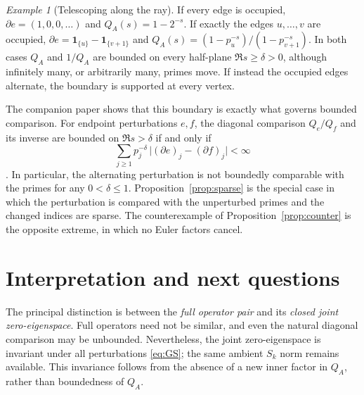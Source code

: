 \documentclass[12pt,letterpaper]{article}
\theoremstyle{remark}
\newtheorem{example}[theorem]{Example}
\numberwithin{equation}{section}
\begin{document}
\begin{example}[Telescoping along the ray]\label{ex:ray}
If every edge is occupied, $\partial e=(1,0,0,\ldots)$ and
$Q_A(s)=1-2^{-s}$.  If exactly the edges $u,\ldots,v$ are occupied,
$\partial e=\mathbf 1_{\{u\}}-\mathbf 1_{\{v+1\}}$ and
$Q_A(s)=(1-p_u^{-s})/(1-p_{v+1}^{-s})$.  In both cases $Q_A$ and $1/Q_A$
are bounded on every half-plane $\Re s\ge\delta>0$, although infinitely
many, or arbitrarily many, primes move.  If instead the occupied edges
alternate, the boundary is supported at every vertex.
\end{example}

The companion paper shows that this boundary is exactly what governs
bounded comparison.  For endpoint perturbations $e,f$, the diagonal
comparison $Q_e/Q_f$ and its inverse are bounded on $\Re s>\delta$ if
and only if
\[
 \sum_{j\ge1}p_j^{-\delta}\,\bigl|(\partial e)_j-(\partial f)_j\bigr|<\infty
\]
\cite[Theorem~5.1]{PP26}.  In particular, the alternating perturbation
is not boundedly comparable with the primes for any $0<\delta\le1$.
Proposition~\ref{prop:sparse} is the special case in which the
perturbation is compared with the unperturbed primes and the changed
indices are sparse.  The counterexample of Proposition~\ref{prop:counter}
is the opposite extreme, in which no Euler factors cancel.

\section{Interpretation and next questions}
The principal distinction is between the \emph{full operator pair} and its \emph{closed joint zero-eigenspace}. Full operators need not be similar, and even the natural diagonal comparison may be unbounded. Nevertheless, the joint zero-eigenspace is invariant under all perturbations \eqref{eq:GS}; the same ambient $S_k$ norm remains available. This invariance follows from the absence of a new inner factor in $Q_A$, rather than boundedness of $Q_A$.
\end{document}
